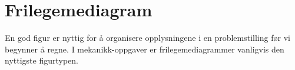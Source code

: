 \chapter{Frilegemediagram}

En god figur er nyttig for å organisere opplysningene i en problemstilling før vi begynner å regne. I mekanikk-oppgaver er frilegemediagrammer vanligvis den nyttigste figurtypen.